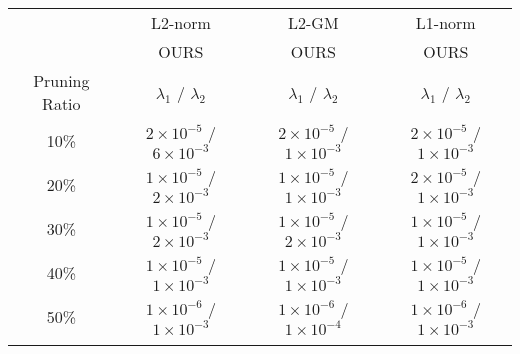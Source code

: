 \begin{table*}[h]
\centering 
\scriptsize
\begin{tabular}{c|c|c|c}\Xhline{2\arrayrulewidth}
\multirow{2}{*}{Criterion} & L2-norm& L2-GM & L1-norm\\ \cline{2-4} 
& OURS& OURS& OURS\\ \hline
Pruning Ratio& $\lambda_1$ / $\lambda_2$  & $\lambda_1$ / $\lambda_2$  & $\lambda_1$ / $\lambda_2$  \\\Xhline{2\arrayrulewidth}
10\%  & $2\times10^{-5}$ / $6\times10^{-3}$ & $2\times10^{-5}$ / $1\times10^{-3}$ & $2\times10^{-5}$ / $1\times10^{-3}$ \\ \hline
20\%  & $1\times10^{-5}$ / $2\times10^{-3}$ & $1\times10^{-5}$ / $1\times10^{-3}$ & $2\times10^{-5}$ / $1\times10^{-3}$ \\ \hline
30\%  & $1\times10^{-5}$ / $2\times10^{-3}$ & $1\times10^{-5}$ / $2\times10^{-3}$ & $1\times10^{-5}$ / $1\times10^{-3}$ \\ \hline
40\%  & $1\times10^{-5}$ / $1\times10^{-3}$ & $1\times10^{-5}$ / $1\times10^{-3}$ & $1\times10^{-5}$ / $1\times10^{-3}$ \\ \hline
50\%  & $1\times10^{-6}$ / $1\times10^{-3}$ & $1\times10^{-6}$ / $1\times10^{-4}$ & $1\times10^{-6}$ / $1\times10^{-3}$  \\ \Xhline{2\arrayrulewidth}
\end{tabular}%
\vspace{1mm}


\end{table*}
